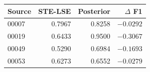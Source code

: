 \begin{tabular}{@{}lrrr@{}}
\toprule
Source & STE-LSE & Posterior & $\Delta$ F1\\
\midrule
00007 & 0.7967 & 0.8258 & $-0.0292$\\
00019 & 0.6433 & 0.9500 & $-0.3067$\\
00049 & 0.5290 & 0.6984 & $-0.1693$\\
00053 & 0.6273 & 0.6552 & $-0.0279$\\
\bottomrule
\end{tabular}
